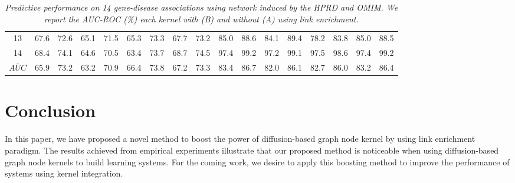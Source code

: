 \documentclass[runningheads,a4paper]{llncs}
\begin{document}
\begin{table*}[!htbp]
\begin{tabular}{|c|c|g|c|g|c|g|c|g|c|g|c|g|c|g|c|g|}
13 & 67.6 & 72.6 & 65.1 & 71.5 & 65.3 & 73.3 & 67.7 & 73.2 & 85.0 & 88.6 & 84.1 & 89.4 & 78.2 & 83.8 & 85.0 & 88.5 \\
14 & 68.4 & 74.1 & 64.6 & 70.5 & 63.4 & 73.7 & 68.7 & 74.5 & 97.4 & 99.2 & 97.2 & 99.1 & 97.5 & 98.6 & 97.4 & 99.2 \\
\hline
$\overline{AUC}$ & 65.9 & 73.2 & 63.2 & 70.9 & 66.4 & 73.8 & 67.2 & 73.3 & 83.4 & 86.7 & 82.0 & 86.1 & 82.7 & 86.0 & 83.2 & 86.4 \\
\hline
\end{tabular}
\caption{\textit {Predictive performance on 14 gene-disease associations using network induced by the HPRD and OMIM. We report the AUC-ROC (\%) each kernel with (B) and without (A) using link enrichment.}}
\label{table:results2}
\end{table*}
\section{Conclusion}
\label{conclusion}
In this paper, we have proposed a novel method to boost the power of diffusion-based graph node kernel by using link enrichment paradigm. The results achieved from empirical experiments illustrate that our proposed method is noticeable when using diffusion-based graph node kernels to build learning systems. For the coming work, we desire to apply this boosting method to improve the performance of systems using kernel integration.


% 
% 
\end{document}
